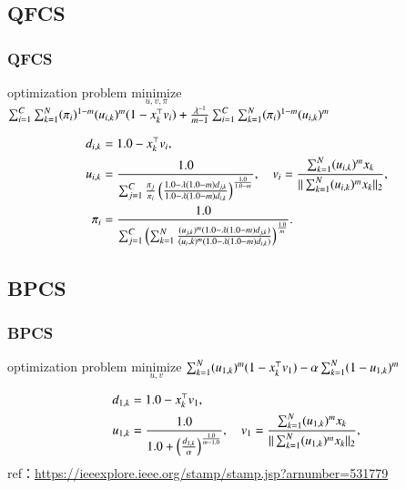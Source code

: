 \documentclass[fleqn,dvipdfmx,10pt]{beamer}
\begin{document}
\subsection{QFCS}
\begin{frame}\frametitle{QFCS}%
  \begin{block}{optimization problem}
    $\underset{u,v,\pi}{\text{minimize}}$
    $\sum_{i=1}^C\sum_{k=1}^N(\pi_{i})^{1-m}(u_{i,k})^m(1-x_k^{\top}v_i)+\frac{\lambda^{-1}}{m-1}\sum_{i=1}^C\sum_{k=1}^N(\pi_{i})^{1-m}(u_{i,k})^m$\centering\\
  \end{block}
  \begin{align*}
    d_{i,k}&=1.0-x_k^{\top}v_i,\\
    u_{i,k}&=\frac{1.0}{\sum_{j=1}^C\frac{\pi_{j}}{\pi_{i}}\left(\frac{1.0-\lambda(1.0-m)d_{j,k}}{1.0-\lambda(1.0-m)d_{i,k}}\right)^{\frac{1.0}{1.0-m}}},\quad
    v_{i}=\frac{\sum_{k=1}^N (u_{i,k})^m x_{k}}{||\sum_{k=1}^N (u_{i,k})^mx_{k}||_2},\\
    \pi_{i}&=\frac{1.0}{\sum_{j=1}^C\left(\sum_{k=1}^N\frac{(u_{j,k})^m(1.0-\lambda(1.0-m)d_{j,k})}{(u_i,k)^m(1.0-\lambda(1.0-m)d_{i,k})}\right)^{\frac{1.0}{m}}}.\\
  \end{align*}
\end{frame}

\subsection{BPCS}
\begin{frame}\frametitle{BPCS}
  \begin{block}{optimization problem}
    $\underset{u,v}{\text{minimize}}$
    $\sum_{k=1}^N(u_{1,k})^m(1-x_k^{\top}v_1)-\alpha\sum_{k=1}^N(1-u_{1,k})^m$ \centering\\
  \end{block}
  \begin{align*}
    d_{1,k}&=1.0-x_k^{\top}v_1,\\
    u_{1,k}&=\frac{1.0}{1.0+\left(\frac{d_{1,k}}{\alpha}\right)^{\frac{1.0}{m-1.0}}},\quad
    v_{1}=\frac{\sum_{k=1}^N (u_{1,k})^m x_{k}}{||\sum_{k=1}^N (u_{1,k})^mx_{k}||_2},\\
  \end{align*}
  ref：\url{https://ieeexplore.ieee.org/stamp/stamp.jsp?arnumber=531779}\centering
\end{frame}
\end{document}
